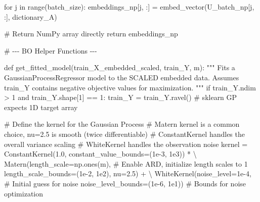 \documentclass[
  letterpaper,
  DIV=11,
  numbers=noendperiod]{scrartcl}
\newenvironment{Shaded}{\begin{snugshade}}{\end{snugshade}}
\newcommand{\BuiltInTok}[1]{\textcolor[rgb]{0.00,0.23,0.31}{#1}}
\newcommand{\CommentTok}[1]{\textcolor[rgb]{0.37,0.37,0.37}{#1}}
\newcommand{\ControlFlowTok}[1]{\textcolor[rgb]{0.00,0.23,0.31}{#1}}
\newcommand{\DecValTok}[1]{\textcolor[rgb]{0.68,0.00,0.00}{#1}}
\newcommand{\FloatTok}[1]{\textcolor[rgb]{0.68,0.00,0.00}{#1}}
\newcommand{\KeywordTok}[1]{\textcolor[rgb]{0.00,0.23,0.31}{#1}}
\newcommand{\NormalTok}[1]{\textcolor[rgb]{0.00,0.23,0.31}{#1}}
\newcommand{\OperatorTok}[1]{\textcolor[rgb]{0.37,0.37,0.37}{#1}}
\begin{document}
\begin{Shaded}
\begin{Highlighting}[]
    \ControlFlowTok{for}\NormalTok{ j }\KeywordTok{in} \BuiltInTok{range}\NormalTok{(batch\_size):}
\NormalTok{        embeddings\_np[j, :] }\OperatorTok{=}\NormalTok{ embed\_vector(U\_batch\_np[j, :], dictionary\_A)}

    \CommentTok{\# Return NumPy array directly}
    \ControlFlowTok{return}\NormalTok{ embeddings\_np}


\CommentTok{\# {-}{-}{-} BO Helper Functions {-}{-}{-}}

\KeywordTok{def}\NormalTok{ get\_fitted\_model(train\_X\_embedded\_scaled, train\_Y, m):}
    \CommentTok{"""}
\CommentTok{    Fits a GaussianProcessRegressor model to the SCALED embedded data.}
\CommentTok{    Assumes train\_Y contains negative objective values for maximization.}
\CommentTok{    """}
    \ControlFlowTok{if}\NormalTok{ train\_Y.ndim }\OperatorTok{\textgreater{}} \DecValTok{1} \KeywordTok{and}\NormalTok{ train\_Y.shape[}\DecValTok{1}\NormalTok{] }\OperatorTok{==} \DecValTok{1}\NormalTok{:}
\NormalTok{        train\_Y }\OperatorTok{=}\NormalTok{ train\_Y.ravel() }\CommentTok{\# sklearn GP expects 1D target array}

    \CommentTok{\# Define the kernel for the Gaussian Process}
    \CommentTok{\# Matern kernel is a common choice, nu=2.5 is smooth (twice differentiable)}
    \CommentTok{\# ConstantKernel handles the overall variance scaling}
    \CommentTok{\# WhiteKernel handles the observation noise}
\NormalTok{    kernel }\OperatorTok{=}\NormalTok{ ConstantKernel(}\FloatTok{1.0}\NormalTok{, constant\_value\_bounds}\OperatorTok{=}\NormalTok{(}\FloatTok{1e{-}3}\NormalTok{, }\FloatTok{1e3}\NormalTok{)) }\OperatorTok{*} \OperatorTok{\textbackslash{}}
\NormalTok{             Matern(length\_scale}\OperatorTok{=}\NormalTok{np.ones(m), }\CommentTok{\# Enable ARD, initialize length scales to 1}
\NormalTok{                    length\_scale\_bounds}\OperatorTok{=}\NormalTok{(}\FloatTok{1e{-}2}\NormalTok{, }\FloatTok{1e2}\NormalTok{),}
\NormalTok{                    nu}\OperatorTok{=}\FloatTok{2.5}\NormalTok{) }\OperatorTok{+} \OperatorTok{\textbackslash{}}
\NormalTok{             WhiteKernel(noise\_level}\OperatorTok{=}\FloatTok{1e{-}4}\NormalTok{, }\CommentTok{\# Initial guess for noise}
\NormalTok{                         noise\_level\_bounds}\OperatorTok{=}\NormalTok{(}\FloatTok{1e{-}6}\NormalTok{, }\FloatTok{1e1}\NormalTok{)) }\CommentTok{\# Bounds for noise optimization}


\end{Highlighting}
\end{Shaded}
\end{document}

